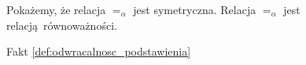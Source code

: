 \begin{wniosek}
Pokażemy, że relacja \(=_{\alpha}\) jest symetryczna. 
  Relacja \(=_{\alpha}\) jest relacją równoważności.
  \begin{dowod}Fakt \ref{def:odwracalnosc_podstawienia} 
   \end{dowod}
\end{wniosek}






